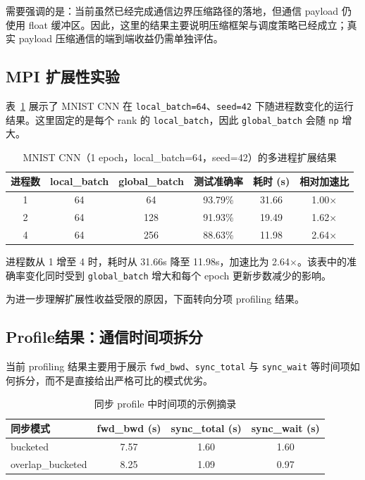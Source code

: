 \documentclass[a4paper,11pt,oneside]{article}
\begin{document}
需要强调的是：当前虽然已经完成通信边界压缩路径的落地，但通信 payload 仍使用 float 缓冲区。因此，这里的结果主要说明压缩框架与调度策略已经成立；真实 payload 压缩通信的端到端收益仍需单独评估。

\subsection{MPI 扩展性实验}

表~\ref{tab:mpi_scaling} 展示了 MNIST CNN 在 \texttt{local\_batch=64}、\texttt{seed=42} 下随进程数变化的运行结果。这里固定的是每个 rank 的 \texttt{local\_batch}，因此 \texttt{global\_batch} 会随 \texttt{np} 增大。

\begin{table}[h]
\centering
\begin{tabular}{cccccc}
\hline
进程数 & local\_batch & global\_batch & 测试准确率 & 耗时 (s) & 相对加速比 \\
\hline
1 & 64 & 64  & 93.79\% & 31.66 & 1.00$\times$ \\
2 & 64 & 128 & 91.93\% & 19.49 & 1.62$\times$ \\
4 & 64 & 256 & 88.63\% & 11.98 & 2.64$\times$ \\
\hline
\end{tabular}
\caption{MNIST CNN（1 epoch，local\_batch=64，seed=42）的多进程扩展结果}
\label{tab:mpi_scaling}
\end{table}

进程数从 1 增至 4 时，耗时从 31.66s 降至 11.98s，加速比为 2.64$\times$。该表中的准确率变化同时受到 \texttt{global\_batch} 增大和每个 epoch 更新步数减少的影响。

为进一步理解扩展性收益受限的原因，下面转向分项 profiling 结果。

\subsection{Profile结果：通信时间项拆分}

当前 profiling 结果主要用于展示 \texttt{fwd\_bwd}、\texttt{sync\_total} 与 \texttt{sync\_wait} 等时间项如何拆分，而不是直接给出严格可比的模式优劣。

\begin{table}[h]
\centering
\begin{tabular}{lccc}
\hline
同步模式 & fwd\_bwd (s) & sync\_total (s) & sync\_wait (s) \\
\hline
bucketed         & 7.57 & 1.60 & 1.60 \\
overlap\_bucketed & 8.25 & 1.09 & 0.97 \\
\hline
\end{tabular}
\caption{同步 profile 中时间项的示例摘录}
\label{tab:mpi_profile}
\end{table}
\end{document}
